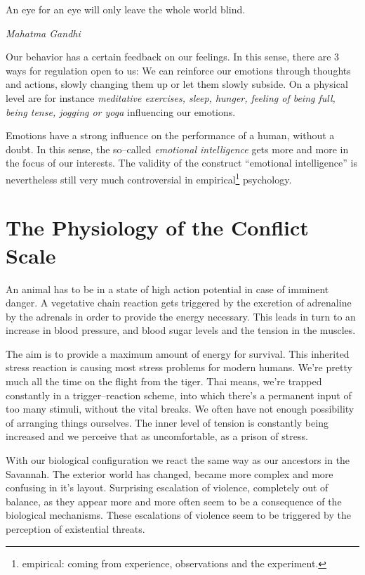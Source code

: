 \documentclass[../Book.Stress_regulation.tex]{subfiles}
\begin{document}
\epigraph{An eye for an eye will only leave the whole world blind.}{\textit{Mahatma Gandhi}}

Our behavior has a certain feedback on our feelings.
In this sense, there are 3 ways for regulation open to us:
We can reinforce our emotions through thoughts and actions,
slowly changing them up
or let them slowly subside.
On a physical level are for instance \emph{meditative exercises, sleep, hunger, feeling of being full, being tense, jogging or yoga} influencing our emotions.

Emotions have a strong influence on the performance of a human, without a doubt.
In this sense, the so--called \emph{emotional intelligence} gets more and more in the focus of our interests.
The validity of the construct ``emotional intelligence'' is nevertheless still very much controversial in
empirical\footnote{empirical: coming from experience, observations and the experiment.} psychology.

\section{The Physiology of the Conflict Scale}

An animal has to be in a state of high action potential in case of imminent danger.
A vegetative chain reaction gets triggered by the excretion of adrenaline by the adrenals in order to provide the energy necessary.
This leads in turn to an increase in blood pressure, and blood sugar levels and the tension in the muscles.

The aim is to provide a maximum amount of energy for survival.
This inherited stress reaction is causing most stress problems for modern humans.
We're pretty much all the time on the flight from the tiger.
Thai means, we're trapped constantly in a trigger--reaction scheme, into which there's a permanent input of too many stimuli, without the vital breaks.
We often have not enough possibility of arranging things ourselves.
The inner level of tension is constantly being increased and we perceive that as uncomfortable, as a prison of stress.

With our biological configuration we react the same way as our ancestors in the Savannah.
The exterior world has changed, became more complex and more confusing in it's layout.
Surprising escalation of violence, completely out of balance, as they appear more and more often seem to be a consequence of the biological mechanisms.
These escalations of violence seem to be triggered by the perception of existential threats.
\end{document}
